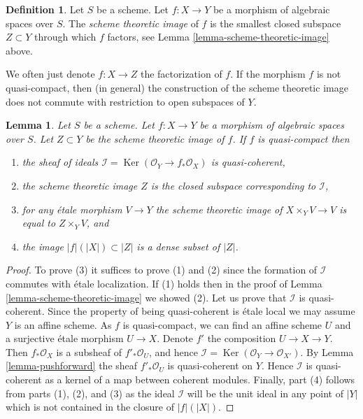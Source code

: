 \documentclass{stacks-project}
\theoremstyle{plain}
\newtheorem{lemma}[subsection]{Lemma}
\theoremstyle{definition}
\newtheorem{definition}[subsection]{Definition}
\theoremstyle{remark}
\numberwithin{equation}{subsection}
\def\Ker{\mathop{\mathrm{Ker}}}
\begin{document}
\begin{definition}
\label{definition-scheme-theoretic-image}
Let $S$ be a scheme. Let $f : X \to Y$ be a morphism of algebraic spaces
over $S$. The {\it scheme theoretic image} of $f$ is the smallest closed
subspace $Z \subset Y$ through which $f$
factors, see Lemma \ref{lemma-scheme-theoretic-image} above.
\end{definition}

\noindent
We often just denote $f : X \to Z$ the factorization of $f$.
If the morphism $f$ is not quasi-compact, then (in general) the
construction of the scheme theoretic image does not commute with
restriction to open subspaces of $Y$.

\begin{lemma}
\label{lemma-quasi-compact-scheme-theoretic-image}
Let $S$ be a scheme.
Let $f : X \to Y$ be a morphism of algebraic spaces over $S$.
Let $Z \subset Y$ be the scheme theoretic image of $f$.
If $f$ is quasi-compact then
\begin{enumerate}
\item the sheaf of ideals
$\mathcal{I} = \Ker(\mathcal{O}_Y \to f_*\mathcal{O}_X)$
is quasi-coherent,
\item the scheme theoretic image $Z$ is the closed subspace
corresponding to $\mathcal{I}$,
\item for any \'etale morphism $V \to Y$ the scheme theoretic image of
$X \times_Y V \to V$ is equal to $Z \times_Y V$, and
\item the image $|f|(|X|) \subset |Z|$ is a dense subset of $|Z|$.
\end{enumerate}
\end{lemma}

\begin{proof}
To prove (3) it suffices to prove (1) and (2) since the
formation of $\mathcal{I}$ commutes with \'etale localization.
If (1) holds then in the proof of Lemma \ref{lemma-scheme-theoretic-image}
we showed (2). Let us prove that $\mathcal{I}$ is quasi-coherent.
Since the property of being quasi-coherent is \'etale local we may
assume $Y$ is an affine scheme. As $f$ is quasi-compact,
we can find an affine scheme $U$ and a surjective \'etale morphism
$U \to X$. Denote $f'$ the composition $U \to X \to Y$.
Then $f_*\mathcal{O}_X$ is a subsheaf of $f'_*\mathcal{O}_U$,
and hence $\mathcal{I} = \Ker(\mathcal{O}_Y \to \mathcal{O}_{X'})$.
By Lemma \ref{lemma-pushforward}
the sheaf $f'_*\mathcal{O}_U$ is quasi-coherent on $Y$. Hence $\mathcal{I}$
is quasi-coherent as a kernel of a map between coherent modules.
Finally, part (4) follows from parts (1), (2), and (3) as the ideal
$\mathcal{I}$ will be the unit ideal in any point of $|Y|$ which is
not contained in the closure of $|f|(|X|)$.
\end{proof}
\end{document}
